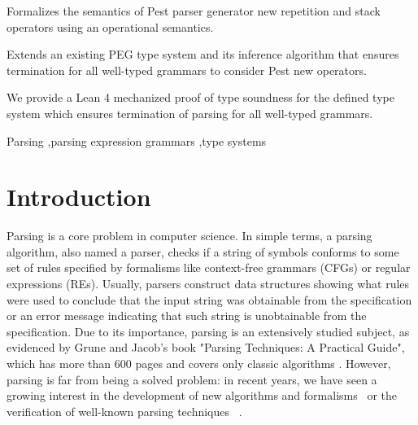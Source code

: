 \documentclass[preprint,12pt]{elsarticle}
\theoremstyle{definition}
\begin{document}
\begin{frontmatter}

\begin{highlights}
\item Formalizes the semantics of Pest parser generator new repetition and stack operators
  using an operational semantics.
\item Extends an existing PEG type system and its inference algorithm that ensures
  termination for all well-typed grammars to consider Pest new operators.
\item We provide a Lean 4 mechanized proof of type soundness for the defined type system which
  ensures termination of parsing for all well-typed grammars.
\end{highlights}

\begin{keyword}
Parsing \sep parsing expression grammars \sep type systems
\end{keyword}

\end{frontmatter}

\linenumbers


\section{Introduction}\label{sec:intro}

Parsing is a core problem in computer science. In simple terms, a parsing
algorithm, also named a parser, checks if a string of symbols conforms to some
set of rules specified by formalisms like context-free grammars (CFGs) or
regular expressions (REs). Usually, parsers construct data structures showing
what rules were used to conclude that the input string was obtainable from the
specification or an error message indicating that such string is unobtainable
from the specification. Due to its importance, parsing is an extensively studied
subject, as evidenced by Grune and Jacob's book "Parsing Techniques: A Practical
Guide", which has more than 600 pages and covers only classic algorithms \cite{Grune90}.
However, parsing is far from being a solved problem: in recent years,
we have seen a growing interest in the development of new algorithms and
formalisms~\cite{Ford2004, Trevor10,Asperti10, Lucks17, Zhang23} or the verification
of well-known parsing techniques ~\cite{FirsovU14, FirsovU13,LopesRC16,Bernardy16}.
\end{document}
